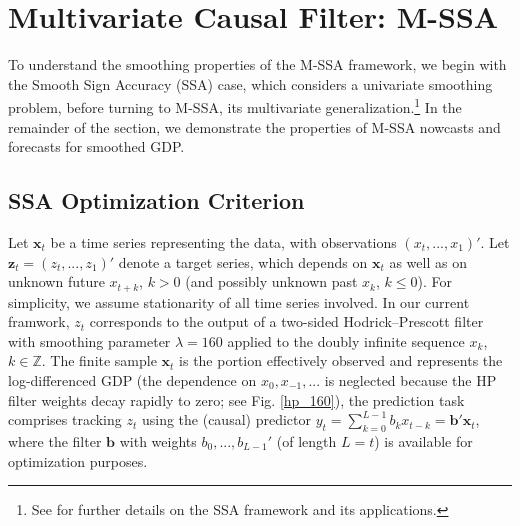 \documentclass[11pt,a4paper]{article}
\begin{document}
\section{Multivariate Causal Filter: M-SSA}\label{sec:mSSA}

To understand the smoothing properties of the M-SSA framework, we begin with the Smooth Sign Accuracy (SSA) case, which considers a univariate smoothing problem, before turning to M-SSA, its multivariate generalization.\footnote{See \cite{Wildi2024} for further details on the SSA framework and its applications.} In the remainder of the section, we demonstrate the properties of M-SSA nowcasts and forecasts for smoothed GDP.

\subsection{SSA Optimization Criterion}

Let $\mathbf{x}_t$ be a time series representing the data, with observations $(x_{t},...,x_{1})'$. Let $\mathbf{z}_t=(z_{t},...,z_1)'$  denote a target series, which depends on $\mathbf{x}_t$ as well as on unknown future $x_{t+k}$, $k>0$ (and possibly unknown past $x_k$, $k\leq 0$). For simplicity, we assume stationarity of all time series involved. In our current framwork, $z_t$ corresponds to the output of a two-sided Hodrick–Prescott filter with smoothing parameter $\lambda = 160$ applied to the doubly infinite sequence $x_k$, $k\in\mathbb{Z}$. The finite sample $\mathbf{x}_t$ is the portion effectively observed and represents the log-differenced GDP (the dependence on $x_0, x_{-1},...$ is neglected because the HP filter weights decay rapidly to zero; see Fig. \eqref{hp_160}), the prediction task comprises tracking $z_{t}$  using the (causal) predictor $y_{t}=\sum_{k=0}^{L-1} b_{k}x_{t-k}=\mathbf{b}'\mathbf{x}_t$, where the filter $\mathbf{b}$ with weights $b_0,...,b_{L-1}'$ (of length $L=t$) is available for optimization purposes.
\end{document}

